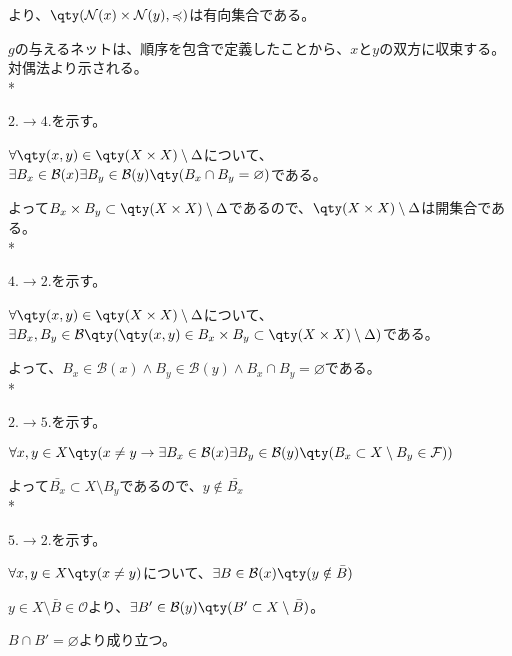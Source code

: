 {  より、$\qty(\mathcal{N}(x) \times \mathcal{N}(y), \preccurlyeq)$は有向集合である。

  $g$の与えるネットは、順序を包含で定義したことから、$x$と$y$の双方に収束する。対偶法より示される。\\*

  $2. \rightarrow 4.$を示す。

  $\forall \qty(x, y) \in \qty(X \times X) \setminus \Delta$について、$\exists B_x \in \mathcal{B}(x) \exists B_y \in \mathcal{B}(y) \qty(B_x \cap B_y = \varnothing)$である。

  よって$B_x \times B_y \subset \qty(X \times X) \setminus \Delta$であるので、$\qty(X \times X) \setminus \Delta$は開集合である。\\*

  $4. \rightarrow 2.$を示す。

  $\forall \qty(x, y) \in \qty(X \times X) \setminus \Delta$について、$\exists B_x, B_y \in \mathcal{B} \qty(\qty(x, y) \in B_x \times B_y \subset \qty(X \times X) \setminus \Delta)$である。

  よって、$B_x \in \mathcal{B}(x) \land B_y \in \mathcal{B}(y) \land B_x \cap B_y = \varnothing$である。\\*

  $2. \rightarrow 5.$を示す。

  $\forall x, y \in X \qty(x \neq y \rightarrow \exists B_x \in \mathcal{B}(x) \exists B_y \in \mathcal{B}(y) \qty(B_x \subset X \setminus B_y \in \mathcal{F}))$

  よって$\bar{B_x} \subset X \setminus B_y$であるので、$y \notin \bar{B_x}$\\*

  $5. \rightarrow 2.$を示す。

  $\forall x, y \in X \qty(x \neq y)$について、$\exists B \in \mathcal{B}(x) \qty(y \notin \bar{B})$

  $y \in X \setminus \bar{B} \in \mathcal{O}$より、$\exists B' \in \mathcal{B}(y) \qty(B' \subset X \setminus \bar{B})$。

  $B \cap B' = \varnothing$より成り立つ。
}


